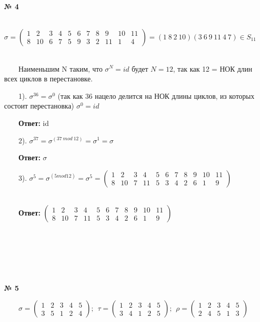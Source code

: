 \documentclass[a4paper, 12pt]{article}
\begin{document}
    \\
    \\
    \\ \textbf{№ 4}
    \\
    \par \ \ \ \ $\sigma = \begin{pmatrix}1 & 2 & 3 & 4 & 5 & 6 & 7 & 8 & 9 & 10 & 11 \\8 & 10 & 6 & 7 & 5 & 9 & 3 & 2 & 11 & 1 & 4\end{pmatrix} = (1 \ 8 \ 2 \ 10)(3 \ 6 \ 9 \ 11 \ 4 \ 7) \in S_{11}$
    \\
    \\
    \par \ \ \ \ Наименьшим N таким, что $\sigma^N = id$ будет $N = 12$, так как 12 = НОК длин всех циклов в перестановке.
    \\
    \par \ \ \ \ 1). $\sigma^{36} = \sigma^{0}$ (так как 36 нацело делится на НОК длины циклов, из которых состоит перестановка) $\sigma^{0} = id$
    \par \ \ \ \ \textbf{Ответ: } id
    \\
    \par \ \ \ \ 2). $\sigma^{37} = \sigma^{(37 \ mod \ 12)} = \sigma^1 = \sigma$
    \par \ \ \ \ \textbf{Ответ: } $\sigma$
    \\
    \par \ \ \ \ 3). $\sigma^5 = \sigma^{(5 mod 12)} = \sigma^5 = \begin{pmatrix}1 & 2 & 3 & 4 & 5 & 6 & 7 & 8 & 9 & 10 & 11 \\8 & 10 & 7 & 11 & 5 & 3 & 4 & 2 & 6 & 1 & 9\end{pmatrix}$
    \\
    \\
    \par \ \ \ \ \textbf{Ответ: } $\begin{pmatrix}1 & 2 & 3 & 4 & 5 & 6 & 7 & 8 & 9 & 10 & 11 \\8 & 10 & 7 & 11 & 5 & 3 & 4 & 2 & 6 & 1 & 9\end{pmatrix}$
    \\
    \\\\\\\\\\
    \\ \textbf{№ 5}
    \\
    \par \ \ \ \ $\sigma = \begin{pmatrix}1 & 2 & 3 & 4 & 5\\3 & 5 & 1 & 2 & 4 \end{pmatrix}; \ \ \tau = \begin{pmatrix}1 & 2 & 3 & 4 & 5\\3 & 4 & 1 & 2 & 5 \end{pmatrix}; \ \ \rho = \begin{pmatrix}1 & 2 & 3 & 4 & 5\\2 & 4 & 5 & 1 & 3 \end{pmatrix}$ 
\end{document}
